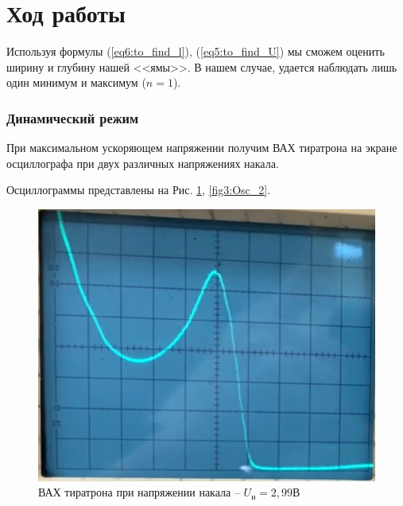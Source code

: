 \documentclass[a4paper,12pt]{article}
\begin{document}
\section*{Ход работы}

Используя формулы (\ref{eq6:to_find_l}), (\ref{eq5:to_find_U}) мы сможем оценить ширину и глубину нашей <<ямы>>. В нашем случае, удается наблюдать лишь один минимум и максимум ($n=1$).

\subsubsection*{Динамический режим}

При максимальном ускоряющем напряжении получим ВАХ тиратрона на экране осциллографа при двух различных напряжениях накала.

Осциллограммы представлены на Рис. \ref{fig2:Osc_1}, \ref{fig3:Osc_2}.

\begin{figure}[h]
	\centering
	\includegraphics[scale=0.9]{fig2}
	\caption{ВАХ тиратрона при напряжении накала -- $U_н = 2,99 В$}
	\label{fig2:Osc_1}
\end{figure}
\end{document}
